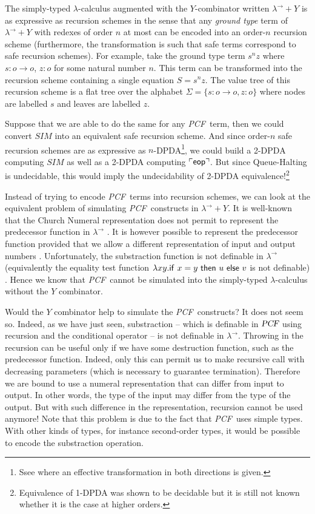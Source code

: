 \documentclass{article}
\newcommand{\encode}[1]{\ulcorner #1 \urcorner}
\newcommand\eop{{\sf eop}}
\newcommand\pcf{\textsl{PCF}}
\begin{document}
The simply-typed $\lambda$-calculus augmented with the
$Y$-combinator written $\lambda^\rightarrow + Y$ is as expressive as
recursion schemes in the sense that any \emph{ground type} term of
$\lambda^\rightarrow + Y$ with redexes of order $n$ at most can be
encoded into an order-$n$ recursion scheme (furthermore, the
transformation is such that safe terms correspond to safe recursion
schemes). For example, take the ground type term $s^n z$ where
$s:o\rightarrow o$, $z :o$ for some natural number $n$. This term
can be transformed into the recursion scheme containing a single
equation $S = s^n z$. The value tree of this recursion scheme is a
flat tree over the alphabet $\Sigma = \{s:o\rightarrow o, z:o\}$
where nodes are labelled $s$ and leaves are labelled $z$.


Suppose that we are able to do the same for any \pcf\ term, then we
could convert $SIM$ into an equivalent safe recursion scheme. And
since order-$n$ safe recursion schemes are as expressive as
$n$-DPDA\footnote{Ssee \cite{KNU02} where an effective
transformation in both directions is given.}, we could build a
2-DPDA computing $SIM$ as well as a 2-DPDA computing
$\encode{\eop}$. But since Queue-Halting is undecidable, this would
imply the undecidability of 2-DPDA equivalence!\footnote{Equivalence
of 1-DPDA was shown to be decidable but it is still not known
whether it is the case at higher orders.}

Instead of trying to encode  \pcf\ terms into recursion schemes, we
can look at the equivalent problem of simulating \pcf\ constructs in
$\lambda^\rightarrow + Y$. It is well-known that the Church Numeral
representation does not permit to represent the predecessor function
in $\lambda^\rightarrow$ \cite{DBLP:journals/jacm/FortuneLO83}. It
is however possible to represent the predecessor function provided
that we allow a different representation of input and output numbers
\cite{DBLP:journals/jacm/FortuneLO83}. Unfortunately, the
substraction function is not definable in $\lambda^\rightarrow$
(equivalently  the equality test function $\lambda xy. {\sf if\ } x
= y {\sf\ then\ } u {\sf\ else\ } v$ is not definable)
\cite{DBLP:journals/jacm/FortuneLO83}. Hence we know that \pcf\
cannot be simulated into the simply-typed $\lambda$-calculus without
the $Y$ combinator.

Would the $Y$ combinator help to simulate the \pcf\ constructs? It
does not seem so. Indeed, as we have just seen, substraction --
which is definable in $\pcf$ using recursion and the conditional
operator -- is not definable in $\lambda^\rightarrow$. Throwing in
the recursion can be useful only if we have some destruction
function, such as the predecessor function. Indeed, only this can
permit us to make recursive call with decreasing parameters (which
is necessary to guarantee termination). Therefore we are bound to
use a numeral representation that can differ from input to output.
In other words, the type of the input may differ from the type of
the output. But with such difference in the representation,
recursion cannot be used anymore! Note that this problem is due to
the fact that \pcf\ uses simple types. With other kinds of types,
for instance second-order types, it would be possible to encode the
substraction operation.
\end{document}
